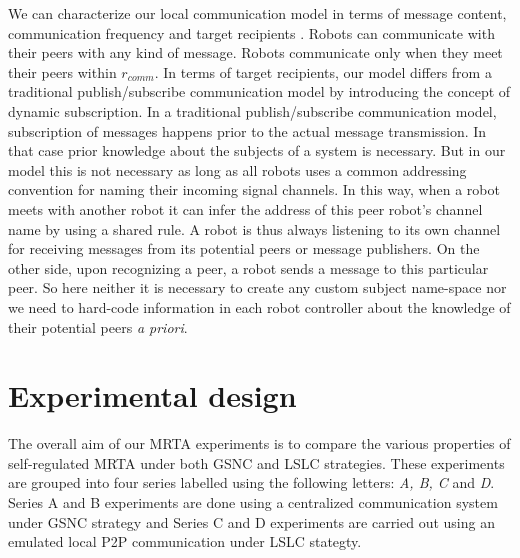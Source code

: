 \documentclass[journal]{IEEEtran}
\begin{document}
We can characterize our local communication model in terms of message content, communication frequency and target recipients \cite{Gerkey+2001}. Robots can communicate with their peers with any kind of message. Robots communicate only when they meet their peers within $r_{comm}$. In terms of target recipients, our model differs from a traditional publish/subscribe communication model by introducing the concept of dynamic subscription. In a traditional publish/subscribe communication model, subscription of messages happens prior to the actual message transmission. In that case prior knowledge about the subjects of a system is necessary. But in our model this is not necessary as long as all robots uses a common addressing convention for naming their incoming signal channels. In this way, when a robot meets with another robot it can infer the address of this peer robot's channel name by using a shared rule. A robot is thus always listening to its own channel for receiving messages from its potential peers or message publishers. On the other side, upon recognizing a peer, a robot sends a message to this particular peer. So here neither it is necessary to create any custom subject name-space  \cite{Gerkey+2001} nor we need to hard-code information in each robot controller about the knowledge of their potential peers {\em a priori}. %
\section{Experimental design}
\label{sec:expt-design}
The overall aim of our MRTA experiments is to compare the various properties of self-regulated MRTA under both GSNC and LSLC strategies. These experiments are grouped into four series labelled using the following letters: \textit{A, B, C} and \textit{D}. Series A and B experiments are done using a centralized communication system under GSNC strategy and Series C and D experiments are carried out using an emulated local P2P communication under LSLC stategty. %
%
\end{document}
